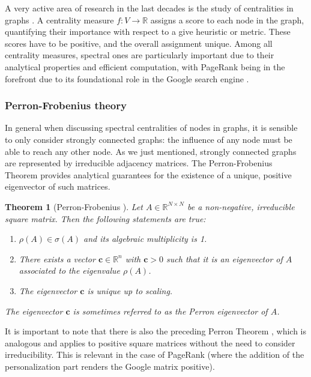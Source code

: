 \documentclass[sn-mathphys-ay]{sn-jnl}%
\newcommand{\R}{\mathbb{R}}
\newcommand{\bc}{\mathbf{c}}
\theoremstyle{thmstyleone}%
\newtheorem{theorem}{Theorem}%
\theoremstyle{thmstyletwo}%
\theoremstyle{thmstylethree}%
\begin{document}
A very active area of research in the last decades is the study of centralities in graphs \cite{saxena2020centrality}. A centrality measure $f:V\longrightarrow \R $ assigns a score to each node in the graph, quantifying their importance with respect to a give heuristic or metric. These scores have to be positive, and the overall assignment unique. Among all centrality measures, spectral ones \cite{vigna2016spectral} are particularly important due to their analytical properties and efficient computation, with PageRank \cite{page1998pagerank} being in the forefront due to its foundational role in the Google search engine \cite{langville2003deeper}.



\subsubsection{Perron-Frobenius theory}


In general when discussing spectral centralities of nodes in graphs, it is sensible to only consider strongly connected graphs: the influence of any node must be able to reach any other node. As we just mentioned, strongly connected graphs are represented by irreducible adjacency matrices. The Perron-Frobenius Theorem provides analytical guarantees for the existence of a unique, positive eigenvector of such matrices.

\begin{theorem}[Perron-Frobenius \cite{perron1907theorie, frobenius1912matrizen}] \label{thm:Perron-Frobenius}
	Let $A\in \R^{N\times N}$ be a non-negative, irreducible square matrix. Then the following statements are true:
	\begin{enumerate}
		\item $\rho(A)\in \sigma(A)$ and its algebraic multiplicity is 1.
		\item There exists a vector $\bc\in\R^n$ with $\bc>0$ such that it is an eigenvector of $A$ associated to the eigenvalue $\rho(A)$.
		\item The eigenvector $\bc$ is unique up to scaling.
	\end{enumerate}
	The eigenvector $\bc$ is sometimes referred to as the Perron eigenvector of $A$.    
\end{theorem}

It is important to note that there is also the preceding Perron Theorem \cite{perron1907theorie}, which is analogous and applies to positive square matrices without the need to consider irreducibility. This is relevant in the case of PageRank (where the addition of the personalization part renders the Google matrix positive).
\end{document}
